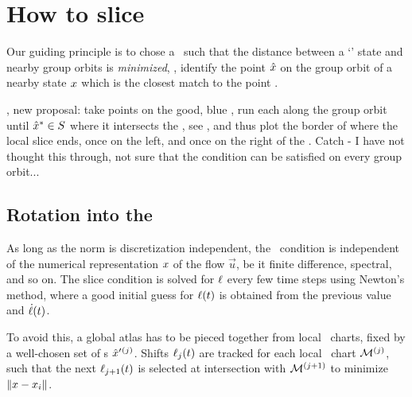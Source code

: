 \section{How to slice}
\label{s:algorithm}

Our guiding principle is to chose a \slice\ such that the distance
between a `{\template}' state {\slicep} and nearby group orbits is
\emph{minimized}, \ie, identify the point $\hat{x}$ on the group orbit
 of a nearby state $x$ which is the closest match to
the {\template} point {\slicep}.

, new proposal: take points on the good,
    blue \po, run each along the group orbit until $\hat{x}^\ast \in S$
    where it intersects the \sliceBord, see , and thus plot
    the border of where the local slice ends, once on the left, and once
    on the right of the {\template}. Catch - I have not thought this
    through, not sure that the condition  can be
    satisfied on every group orbit...

\subsection{Rotation into the \slice}

As long as the norm is discretization independent, the \slice\ condition
 is independent of the numerical representation $x$ of
the flow $\vec{u}$, be it finite difference, spectral, and so on. The
slice condition is solved for $\ell$ every few time steps using
Newton's method, where a good initial guess for $\ell(t)$ is
obtained from the previous value and $\dot{\ell}(t)$.

To avoid this, a global
atlas has to be pieced together from local \slice\ charts, fixed by
a well-chosen set of
\template s ${\hat{x}'}{}^{(j)}$.
Shifts $\ell_j(t)$ are tracked for each local \slice\ chart ${\cal M}{}^{(j)}$,
such that the next $\ell_{j+1}(t)$ is selected at intersection with
${\cal M}{}^{(j+1)}$
to minimize $\|{{x}-{x_i}}\|$.


